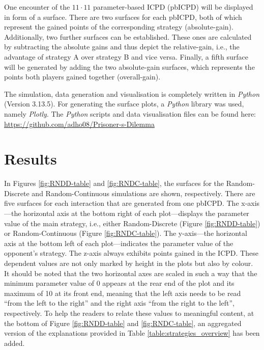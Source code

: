 \documentclass[11pt]{article}
\begin{document}
One encounter of the $11 \cdot 11$ parameter-based ICPD (pbICPD) will be displayed in form of a surface.
There are two surfaces for each pbICPD, both of which represent the gained points of the corresponding strategy (absolute-gain).
Additionally, two further surfaces can be established.
These ones are calculated by subtracting the absolute gains and thus depict the relative-gain, i.e., the advantage of strategy A over strategy B and vice versa.
Finally, a fifth surface will be generated by adding the two absolute-gain surfaces, which represents the points both players gained together (overall-gain).

The simulation, data generation and visualisation is completely written in \textit{Python} (Version 3.13.5).
For generating the surface plots, a \textit{Python} library was used, namely \textit{Plotly}.
The \textit{Python} scripts and data visualisation files can be found here: \url{https://github.com/adho08/Prisoner-s-Dilemma}


\section{Results} \label{sec:results}

In Figures \ref{fig:RNDD-table} and \ref{fig:RNDC-table}, the surfaces for the Random-Discrete and Random-Continuous simulations are shown, respectively. 
There are five surfaces for each interaction that are generated from one pbICPD. 
The x-axis---the horizontal axis at the bottom right of each plot---displays the parameter value of the main strategy, i.e., either Random-Discrete (Figure \ref{fig:RNDD-table}) or Random-Continuous (Figure \ref{fig:RNDC-table}). 
The y-axis---the horizontal axis at the bottom left of each plot---indicates the parameter value of the opponent’s strategy. 
The z-axis always exhibits points gained in the ICPD.
These dependent values are not only marked by height in the plots but also by colour. 
It should be noted that the two horizontal axes are scaled in such a way that the minimum parameter value of 0 appears at the rear end of the plot and its maximum of 10 at its front end, meaning that the left axis needs to be read “from the left to the right” and the right axis “from the right to the left”, respectively. 
To help the readers to relate these values to meaningful content, at the bottom of Figure \ref{fig:RNDD-table} and \ref{fig:RNDC-table}, an aggregated version of the explanations provided in Table \ref{table:strategies_overview} has been added.
\end{document}
